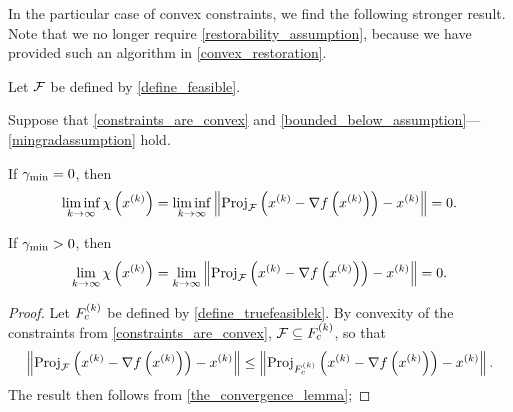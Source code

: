 In the particular case of convex constraints, we find the following stronger result.
Note that we no longer require \cref{restorability_assumption}, because we have provided such an algorithm in \cref{convex_restoration}.


\begin{corollary}
\label{the_convergence_theorem}
Let ${\mathcal F}$ be defined by \cref{define_feasible}.

% 

Suppose that \cref{constraints_are_convex} and \cref{bounded_below_assumption}---\cref{mingradassumption} hold.


If $\gamma_{\textrm{min}} = 0$, then
\begin{align*}
\liminf_{k\to\infty} \chi\left(x^{(k)}\right) = \liminf_{k\to\infty} \left\|{\textrm{Proj}}_{{\mathcal F}}\left(x^{(k)} - \nabla f\left(x^{(k)}\right)\right) - x^{(k)} \right\| = 0.
\end{align*}

If $\gamma_{\textrm{min}} > 0$, then
\begin{align*}
\lim_{k\to\infty} \chi\left(x^{(k)}\right) = \lim_{k\to\infty} \left\|{\textrm{Proj}}_{{\mathcal F}}\left(x^{(k)} - \nabla f\left(x^{(k)}\right)\right) - x^{(k)} \right\| = 0.
\end{align*}
\end{corollary}


\begin{proof}
Let ${F_c^{(k)}}$ be defined by \cref{define_truefeasiblek}.
By convexity of the constraints from \cref{constraints_are_convex}, ${\mathcal F} \subseteq {F_c^{(k)}}$, so that
\begin{align*}
\left\|{\textrm{Proj}}_{{\mathcal F}}\left(x^{(k)} - \nabla f\left(x^{(k)}\right)\right) - x^{(k)} \right\| 
\le \left\|{\textrm{Proj}}_{{F_c^{(k)}}}\left(x^{(k)} - \nabla f\left(x^{(k)}\right)\right) - x^{(k)} \right\|.
\end{align*}
The result then follows from \cref{the_convergence_lemma};

\end{proof}




